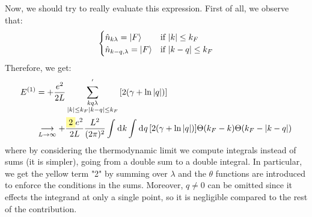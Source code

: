 \documentclass[11pt, a4paper, twoside, openright]{article}
\begin{document}
\begin{itemize}
Now, we should try to really evaluate this expression. First of all, we observe that:
\begin{equation*}
  \begin{cases}
  \hat{n}_{k \lambda } =\ket{F} & \text{if } \abs{k}\le k_F   \\
  \hat{n}_{k-q, \lambda } =\ket{F} & \text{if } \abs{k-q}\le k_F
  \end{cases}
\end{equation*}
Therefore, we get:
\begin{equation*}
\begin{split}
  E^{(1)} &= +\frac{e^2}{2L} \sum_{\substack{k q \lambda  \\ \abs{k}\le k_F  \abs{k-q}\le k_F  } }^{'} \qty[  2 \qty( \gamma + \ln{\abs{q } }  ) ] \\
  &\underset{L \rightarrow \infty }{\longrightarrow }
  + \frac{\mathcolorbox{yellow!40}{2}e^2}{2L} \frac{L^2}{(2 \pi )^2}
  \int_{}^{} \dd[]{k}
  \int_{}^{} \dd[]{q} \qty[  2 \qty( \gamma + \ln{\abs{q } }  ) ]
  \Theta (k_F- k) \Theta (k_F - \abs{k-q} ) \\
\end{split}
\end{equation*}
where by considering the thermodynamic limit we compute integrals instead of sums (it is simpler), going from a double sum to a double integral. In particular, we get the yellow term "2" by summing over \( \lambda  \) and  the \( \theta  \) functions are introduced to enforce the conditions in the sums. Moreover, \( q \neq 0 \) can be omitted since it effects the integrand at only a single point, so it is negligible compared to the rest of the contribution.








\end{itemize}
\end{document}
